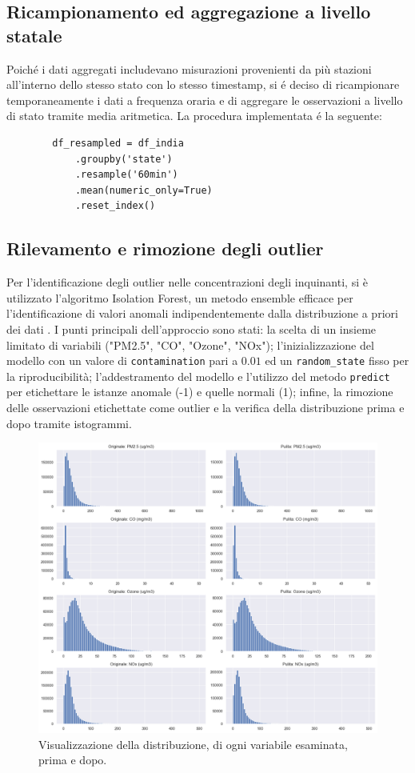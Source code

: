 \documentclass[a4paper,12pt]{report}
\begin{document}
	\subsection{Ricampionamento ed aggregazione a livello statale}
	Poiché i dati aggregati includevano misurazioni provenienti da più stazioni all'interno dello stesso stato con lo stesso timestamp, si é deciso di ricampionare temporaneamente i dati a frequenza oraria e di aggregare le osservazioni a livello di stato tramite media aritmetica. La procedura implementata é la seguente:
	
	\begin{verbatim}
		df_resampled = df_india
			.groupby('state')
			.resample('60min')
			.mean(numeric_only=True)
			.reset_index()
	\end{verbatim}
	
	\subsection{Rilevamento e rimozione degli outlier}
	Per l'identificazione degli outlier nelle concentrazioni degli inquinanti, si è utilizzato l'algoritmo Isolation Forest, un metodo ensemble efficace per l'identificazione di valori anomali indipendentemente dalla distribuzione a priori dei dati \cite{liu2009iforest}. I punti principali dell'approccio sono stati: la scelta di un insieme limitato di variabili ("PM2.5", "CO", "Ozone", "NOx"); l'inizializzazione del modello con un valore di \texttt{contamination} pari a $0.01$ ed un \texttt{random\_state} fisso per la riproducibilità; l'addestramento del modello e l'utilizzo del metodo \texttt{predict} per etichettare le istanze anomale (-1) e quelle normali (1); infine, la rimozione delle osservazioni etichettate come outlier e la verifica della distribuzione prima e dopo tramite istogrammi.
	
	\begin{figure}[H]
		\centering
		\includegraphics[width=1.0\textwidth]{img/distr_prepost_isofor_pm.png}
		\caption{Visualizzazione della distribuzione, di ogni variabile esaminata, prima e dopo.}
	\end{figure}
	
\end{document}
